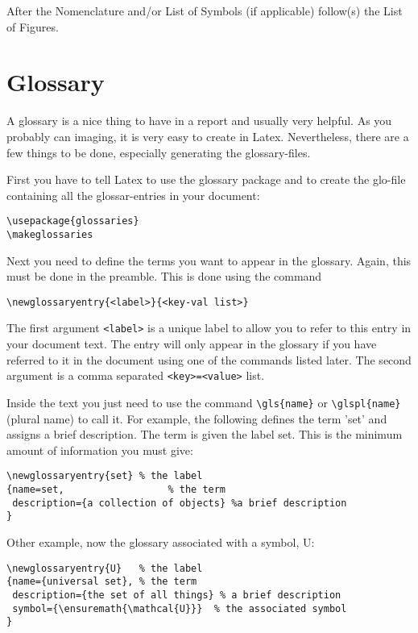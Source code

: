 After the Nomenclature and/or List of Symbols (if applicable) follow(s) the List of Figures. 

\section{Glossary} %
\label{sec:glossary}

A glossary is a nice thing to have in a report and usually very helpful. As you probably can imaging, it is very easy to create in Latex. Nevertheless, there are a few things to be done, especially generating the glossary-files.

First you have to tell Latex to use the glossary package and to create the glo-file containing all the glossar-entries in your document:

\begin{verbatim}
\usepackage{glossaries} 
\makeglossaries
\end{verbatim}

Next you need to define the terms you want to appear in the glossary. Again, this must be done in the preamble. This is done using the command

\verb!\newglossaryentry{<label>}{<key-val list>}! 

The first argument \verb!<label>! is a unique label to allow you to refer to this entry in your document text. The entry will only appear in the glossary if you have referred to it in the document using one of the commands listed later. The second argument is a comma separated \verb!<key>=<value>! list.

Inside the text you just need to use the command \verb!\gls{name}! or \verb!\glspl{name}! (plural name) to call it. For example, the following defines the term 'set' and assigns a brief description. The term is given the label set. This is the minimum amount of information you must give:

\begin{verbatim}
\newglossaryentry{set} % the label
{name=set,            		% the term
 description={a collection of objects} %a brief description
}
 \end{verbatim}

Other example, now the glossary associated with a symbol, \gls{U}:

\begin{verbatim}
\newglossaryentry{U}   % the label
{name={universal set}, % the term
 description={the set of all things} % a brief description
 symbol={\ensuremath{\mathcal{U}}}  % the associated symbol 
}
 \end{verbatim}

